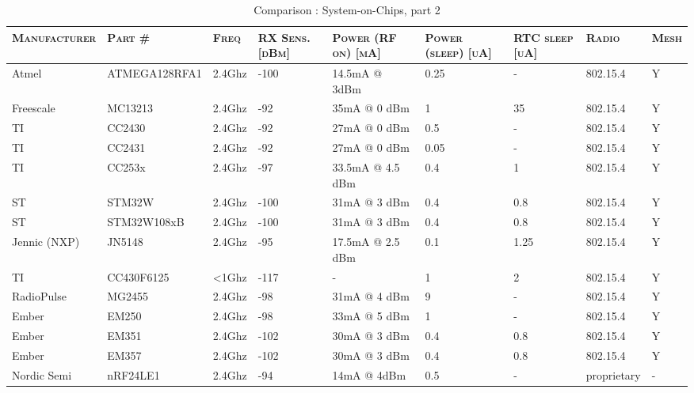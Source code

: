    \begin{sidewaystable}[h]
     \centering
     \begin{tabularx}{0.95\textwidth}{l l l p{1.5cm} p{3.5cm} p{2.1cm} p{1.8cm} l l}
       \textsc{Manufacturer}
       & \textsc{Part \#}
       & \textsc{Freq}
       & \textsc{RX Sens. [dBm]}
       & \textsc{Power (RF on) [mA]}
       & \textsc{Power (sleep) [uA]}
       & \textsc{RTC sleep [uA]}
       & \textsc{Radio}
       & \textsc{Mesh}
        \\ \hline

        Atmel        & ATMEGA128RFA1 & 2.4Ghz & -100    & 14.5mA @ 3dBm    & 0.25   & -     & 802.15.4 & Y      \\ 
        Freescale    & MC13213       & 2.4Ghz & -92     & 35mA @ 0 dBm     & 1      & 35    & 802.15.4 & Y      \\ 
        TI           & CC2430        & 2.4Ghz & -92     & 27mA @ 0 dBm     & 0.5    & -     & 802.15.4 & Y      \\ 
        TI           & CC2431        & 2.4Ghz & -92     & 27mA @ 0 dBm     & 0.05   & -     & 802.15.4 & Y      \\ 
        TI           & CC253x        & 2.4Ghz & -97     & 33.5mA @ 4.5 dBm & 0.4    & 1     & 802.15.4 & Y      \\ 
        ST           & STM32W        & 2.4Ghz & -100    & 31mA @ 3 dBm     & 0.4    & 0.8   & 802.15.4 & Y      \\ 
        ST           & STM32W108xB   & 2.4Ghz & -100    & 31mA @ 3 dBm     & 0.4    & 0.8   & 802.15.4 & Y      \\ 
        Jennic (NXP) & JN5148        & 2.4Ghz & -95     & 17.5mA @ 2.5 dBm & 0.1    & 1.25  & 802.15.4 & Y      \\ 
        TI           & CC430F6125    & <1Ghz  & -117    & -                & 1      & 2     & 802.15.4 & Y      \\ 
        RadioPulse   & MG2455        & 2.4Ghz & -98     & 31mA @ 4 dBm     & 9      & -     & 802.15.4 & Y      \\ 
        Ember        & EM250         & 2.4Ghz & -98     & 33mA @ 5 dBm     & 1      & -     & 802.15.4 & Y      \\ 
        Ember        & EM351         & 2.4Ghz & -102    & 30mA @ 3 dBm     & 0.4    & 0.8   & 802.15.4 & Y      \\ 
        Ember        & EM357         & 2.4Ghz & -102    & 30mA @ 3 dBm     & 0.4    & 0.8   & 802.15.4 & Y      \\ 
        Nordic Semi  & nRF24LE1      & 2.4Ghz & -94     & 14mA @ 4dBm      & 0.5    & -     & proprietary & -   \\

     \end{tabularx}
     \caption{Comparison : System-on-Chips, part 2}
     \label{tab:soc-comparison-2}
   \end{sidewaystable}


